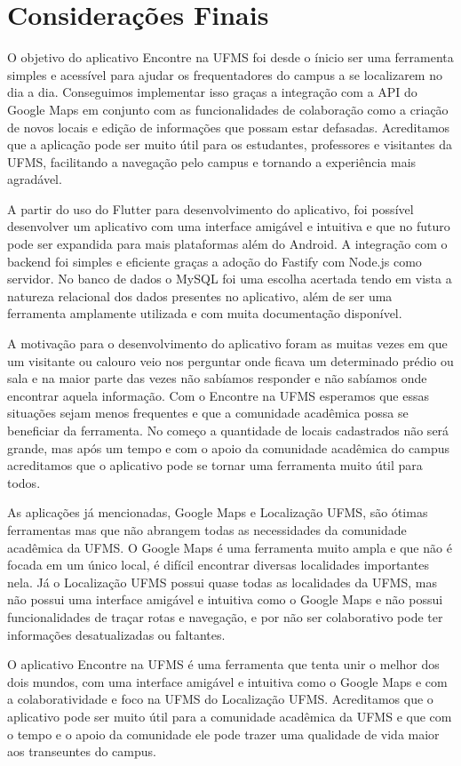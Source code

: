 \section{Considerações Finais}

    O objetivo do aplicativo Encontre na UFMS foi desde o ínicio ser uma ferramenta simples e acessível para ajudar os frequentadores do campus a se localizarem no dia a dia. Conseguimos implementar isso graças a integração com a API do Google Maps em conjunto com as funcionalidades de colaboração como a criação de novos locais e edição de informações que possam estar defasadas. Acreditamos que a aplicação pode ser muito útil para os estudantes, professores e visitantes da UFMS, facilitando a navegação pelo campus e tornando a experiência mais agradável.

    A partir do uso do Flutter para desenvolvimento do aplicativo, foi possível desenvolver um aplicativo com uma interface amigável e intuitiva e que no futuro pode ser expandida para mais plataformas além do Android. A integração com o backend foi simples e eficiente graças a adoção do Fastify com Node.js como servidor. No banco de dados o MySQL foi uma escolha acertada tendo em vista a natureza relacional dos dados presentes no aplicativo, além de ser uma ferramenta amplamente utilizada e com muita documentação disponível.

    A motivação para o desenvolvimento do aplicativo foram as muitas vezes em que um visitante ou calouro veio nos perguntar onde ficava um determinado prédio ou sala e na maior parte das vezes não sabíamos responder e não sabíamos onde encontrar aquela informação. Com o Encontre na UFMS esperamos que essas situações sejam menos frequentes e que a comunidade acadêmica possa se beneficiar da ferramenta. No começo a quantidade de locais cadastrados não será grande, mas após um tempo e com o apoio da comunidade acadêmica do campus acreditamos que o aplicativo pode se tornar uma ferramenta muito útil para todos.

    As aplicações já mencionadas, Google Maps e Localização UFMS, são ótimas ferramentas mas que não abrangem todas as necessidades da comunidade acadêmica da UFMS. O Google Maps é uma ferramenta muito ampla e que não é focada em um único local, é difícil encontrar diversas localidades importantes nela. Já o Localização UFMS possui quase todas as localidades da UFMS, mas não possui uma interface amigável e intuitiva como o Google Maps e não possui funcionalidades de traçar rotas e navegação, e por não ser colaborativo pode ter informações desatualizadas ou faltantes.

    O aplicativo Encontre na UFMS é uma ferramenta que tenta unir o melhor dos dois mundos, com uma interface amigável e intuitiva como o Google Maps e com a colaboratividade e foco na UFMS do Localização UFMS. Acreditamos que o aplicativo pode ser muito útil para a comunidade acadêmica da UFMS e que com o tempo e o apoio da comunidade ele pode trazer uma qualidade de vida maior aos transeuntes do campus.